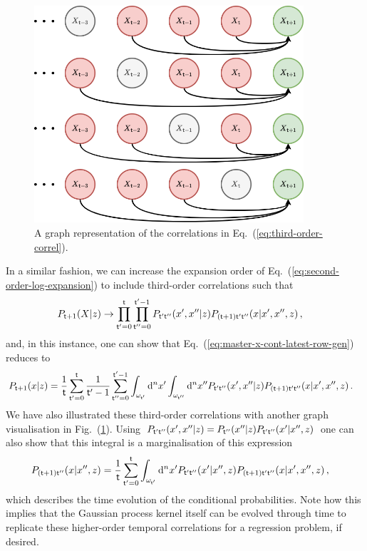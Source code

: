 \begin{figure}[h]
\centering
\includegraphics[width=10cm]{images/chapter-2-third-temporal-correlation.drawio.png}
\caption{A graph representation of the correlations in Eq.~(\ref{eq:third-order-correl}).}
\label{fig:third-temporal-correlation}
\end{figure}

In a similar fashion, we can increase the expansion order of Eq.~(\ref{eq:second-order-log-expansion}) to include third-order correlations such that 
\begin{align}
P_{{\sf t}+1}(X\vert z) &\rightarrow \prod_{{\sf t}'=0}^{{\sf t}}\prod_{{\sf t}''=0}^{{\sf t}'-1} P_{{\sf t}'{\sf t}''}(x',x''\vert z)P_{({\sf t}+1){\sf t}'{\sf t}''}(x\vert x',x'',z) \,,
\end{align}
and, in this instance, one can show that Eq.~(\ref{eq:master-x-cont-latest-row-gen}) reduces to
\begin{align}
P_{{\sf t}+1}(x\vert z) &= \frac{1}{{\sf t}}\sum_{{\sf t}'=0}^{{\sf t}}\frac{1}{{\sf t}'-1}\sum_{{\sf t}''=0}^{{\sf t}'-1}\int_{\omega_{{\sf t}'}}{\rm d}^nx'\int_{\omega_{{\sf t}''}}{\rm d}^nx'' P_{{\sf t}'{\sf t}''}(x',x''\vert z)P_{({\sf t}+1){\sf t}'{\sf t}''}(x\vert x',x'',z) \label{eq:third-order-correl} \,.
\end{align}
We have also illustrated these third-order correlations with another graph visualisation in Fig.~(\ref{fig:third-temporal-correlation}). Using $P_{{\sf t}'{\sf t}''}(x',x''\vert z) = P_{{\sf t}''}(x''\vert z) P_{{\sf t}'{\sf t}''}(x'\vert x'', z)$ one can also show that this integral is a marginalisation of this expression
\begin{align}
P_{({\sf t}+1){\sf t}''}(x\vert x'', z) &= \frac{1}{{\sf t}}\sum_{{\sf t}'=0}^{{\sf t}}\int_{\omega_{{\sf t}'}}{\rm d}^nx'P_{{\sf t}'{\sf t}''}(x'\vert x'',z)P_{({\sf t}+1){\sf t}'{\sf t}''}(x\vert x',x'',z) \,,
\end{align}
which describes the time evolution of the conditional probabilities. Note how this implies that the Gaussian process kernel itself can be evolved through time to replicate these higher-order temporal correlations for a regression problem, if desired.

